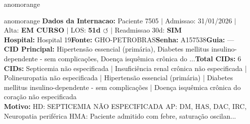 \documentclass[a4paper,10pt]{article}
\begin{document}
\begin{anomalycard}[Internacao 161245 | GHO-PETROBRAS | ALTO (z=3.79)]{anomorange}

\end{anomalycard}

\newpage

\begin{anomalycard}[Internacao 163887 | GHO-PETROBRAS | ALTO (z=3.76)]{anomorange}
\textbf{Dados da Internacao:} Paciente 7505 $\mid$ Admissao: 31/01/2026 $\mid$ Alta: \textcolor{anomorange}{\textbf{EM CURSO}} $\mid$ LOS: \textbf{51d \textcolor{anomorange}{$\circlearrowleft$}} $\mid$ Readmissao 30d: \textcolor{anomred}{\textbf{SIM}}\\
\textbf{Hospital:} Hospital 19\quad\textbf{Fonte:} GHO-PETROBRAS\quad\textbf{Senha:} A157538\quad\textbf{Guia:} ---\\
\textbf{CID Principal:} {\small Hipertensão essencial (primária), Diabetes mellitus insulino-dependente - sem complicações, Doença isquêmica crônica do ...}\quad\textbf{Total CIDs:} 6\\

\textbf{CIDs:} {\scriptsize Septicemia não especificada | Insuficiência renal crônica não especificada | Polineuropatia não especificada | Hipertensão essencial (primária) | Diabetes mellitus insulino-dependente - sem complicações | Doença isquêmica crônica do coração não especificada}\\

\textbf{Motivo:} {\scriptsize HD: SEPTICEMIA NÃO ESPECIFICADA AP: DM, HAS, DAC, IRC, Neuropatia periférica HMA: Paciente admitido com febre, saturação oscilan...}\\


\end{anomalycard}
\end{document}
